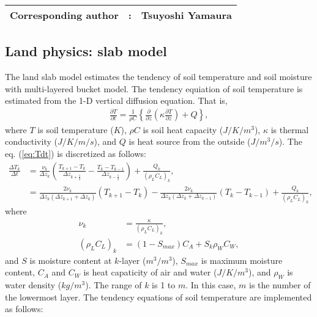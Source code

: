 {\bf \Large 
\begin{tabular}{ccc}
\hline
  Corresponding author & : & Tsuyoshi Yamaura\\
\hline
\end{tabular}
}


\subsection{Land physics: slab model}

The land slab model estimates the tendency of soil temperature and soil moisture with multi-layered bucket model.
The tendency equiation of soil temperature is estimated from the 1-D vertical diffusion equation.
That is,
\begin{align}
  \frac{\partial T}{\partial t} = \frac{1}{\rho C} \left\{ \frac{\partial}{\partial z} \left( \kappa \frac{\partial T}{\partial z} \right) + Q \right\},
  \label{eq:Tdt}
\end{align}
where $T$ is soil temperature ($K$), $\rho C$ is soil heat capacity ($J/K/m^3$), $\kappa$ is thermal conductivity ($J/K/m/s$), and $Q$ is heat source from the outside ($J/m^3/s$).
The eq. (\ref{eq:Tdt}) is discretized as follows:
\begin{align}
  \frac{\Delta T_{k}}{\Delta t} &= \frac{\nu_{k}}{\Delta z_{k}} \left( \frac{T_{k+1}-T_{k}}{\Delta z_{k+\frac{1}{2}}} - \frac{T_{k}-T_{k-1}}{\Delta z_{k-\frac{1}{2}}} \right) + \frac{Q_{k}}{(\rho_{L}C_{L})_{k}}, \\
                                &= \frac{ 2\nu_{k} }{ \Delta z_{k} (\Delta z_{k+1}+\Delta z_{k}) }(T_{k+1}-T_{k}) - \frac{ 2\nu_{k} }{ \Delta z_{k} (\Delta z_{k}+\Delta z_{k-1}) }(T_{k}-T_{k-1}) +\frac{Q_{k}}{(\rho_{L}C_{L})_{k}},
\end{align}
where
\begin{align}
  \nu_{k} &= \frac{\kappa}{(\rho_{L}C_{L})_{k}}, \\
  (\rho_{L}C_{L})_{k} &= ( 1 - S_{max} ) C_{A} + S_{k} \rho_{W}C_{W},
\end{align}
and $S$ is moisture content at $k$-layer ($m^3/m^3$), $S_{max}$ is maximum moisture content, $C_{A}$ and $C_{W}$ is heat capaticity of air and water ($J/K/m^3$), and $\rho_{W}$ is water density ($kg/m^3$).
The range of $k$ is 1 to $m$.
In this case, $m$ is the number of the lowermost layer.
The tendency equations of soil temperature are implemented as follows:
